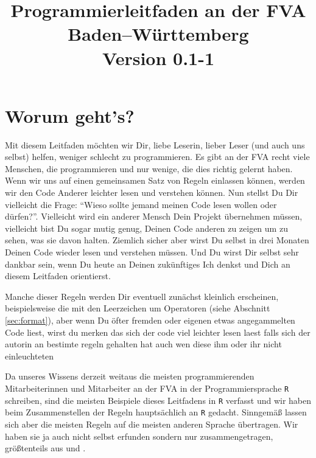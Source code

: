 \documentclass[twoside]{scrartcl}
\providecommand{\R}{\texttt{R}}
\begin{document}


\title{Programmierleitfaden an der FVA Baden--W\"u{}rttemberg\\
\vspace{1cm}
\small{Version 0.1-1}}
\maketitle
\tableofcontents
\thispagestyle{fancy}
\section{Worum geht's?}
Mit diesem Leitfaden m\"o{}chten wir Dir, liebe Leserin, lieber Leser (und auch
uns selbst) helfen, weniger schlecht zu programmieren.
Es gibt an der FVA recht viele Menschen, die programmieren und nur wenige, die
dies richtig gelernt haben. Wenn wir uns auf einen gemeinsamen Satz von Regeln
einlassen k\"o{}nnen, werden wir den Code Anderer leichter lesen und verstehen
k\"o{}nnen.
Nun stellst Du Dir vielleicht die Frage: "`Wieso sollte jemand meinen Code lesen
wollen oder d\"u{}rfen?"'. Vielleicht wird ein anderer Mensch Dein Projekt
\"u{}bernehmen m\"u{}ssen, vielleicht bist Du sogar mutig genug, Deinen Code
anderen zu zeigen um zu sehen, was sie davon halten. Ziemlich sicher aber wirst
Du selbst in drei Monaten Deinen Code wieder lesen und verstehen m\"u{}ssen. Und
Du wirst Dir selbst sehr dankbar sein, wenn Du heute an Deinen zuk\"u{}nftiges
Ich denkst und Dich an diesem Leitfaden orientierst.

Manche dieser Regeln werden Dir eventuell zun\"a{}chst kleinlich erscheinen,
beispielsweise die mit den Leerzeichen  um  Operatoren (siehe Abschnitt
\ref{sec:format}), aber wenn Du \"o{}fter fremden oder eigenen etwas
angegammelten Code liest, wirst
du merken das sich der code viel leichter lesen laest falls sich der autorin  an
bestimte regeln gehalten hat auch wen diese ihm oder ihr nicht einleuchteten

Da unseres Wissens derzeit weitaus die meisten programmierenden Mitarbeiterinnen
und Mitarbeiter an der FVA in der Programmiersprache \R{} schreiben, sind die
meisten Beispiele dieses Leitfadens in \R{} verfasst und wir haben beim
Zusammenstellen der Regeln haupts\"a{}chlich an \R{} gedacht.
Sinngem\"a{}\ss{} lassen sich aber die meisten Regeln auf die meisten
anderen Sprache \"u{}bertragen. Wir haben sie ja auch nicht selbst erfunden
sondern nur zusammengetragen, gr\"o{}\ss{}tenteils aus \cite{cc} und \cite{wsp}.
\end{document}
